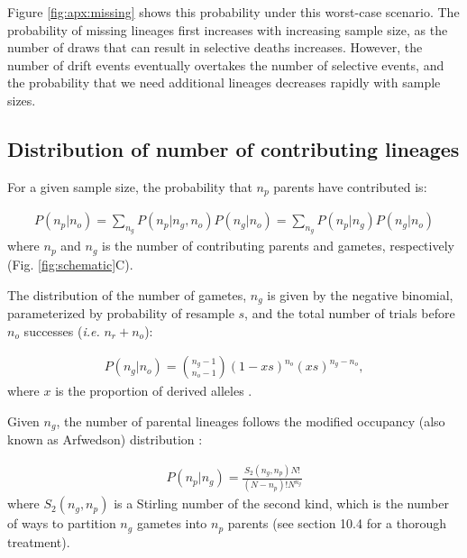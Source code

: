 \documentclass[review]{elsarticle}
\newcommand{\sgcomment}[1]{{\color{red}{SG: #1}}}
\begin{document}
Figure \ref{fig:apx:missing} shows this probability under this worst-case scenario. The probability
of missing lineages first increases with increasing sample size, as the number of draws that can
result in selective deaths increases. However, the number of drift events eventually overtakes the
number of selective events, and the probability that we need additional lineages decreases rapidly
with sample sizes.


\subsection{Distribution of number of contributing lineages}
\label{subsec:distribution}

For a given sample size, the probability that $n_p$ parents have contributed is:

\begin{align}
  \label{eq:conditional}
  P(n_p | n_o) = \sum_{n_g} P(n_p | n_g,n_o)P(n_g | n_o) = \sum_{n_g} P(n_p | n_g)P(n_g | n_o) 
\end{align}
where $n_p$ and $n_g$ is the number of contributing parents and gametes, respectively (Fig.
\ref{fig:schematic}C). 

The distribution of the number of gametes, $n_g$ is given by the negative binomial, parameterized by
probability of resample $s$, and the total number of trials before $n_o$ successes (\textit{i.e.}
$n_r+n_o$): \sgcomment{ The parameter is the number of successes -- the number of trials is the random variable:
The distribution of the number of gametes, $n_g\geq n_o$ is given by the negative binomial, parameterized by
probability of success $1-s$, and the total number of required successes $n_o$ successes:}



\begin{align}
  \label{eq:neg-binomial-trials}
  P(n_g|n_o) = \binom{n_g-1}{n_o-1}(1-xs)^{n_o}(xs)^{n_g-n_o},
\end{align}
where $x$ is the proportion of derived alleles \sgcomment{is this in the parental population or the sample? It would be true for both I think!}. 


Given $n_g$, the number of parental lineages follows the modified occupancy (also known as Arfwedson) distribution \citep{Wakeley2009,ONeill2019,JohnsonEtAl2005}:

\begin{align}
  \label{eq:occupancy}
  P(n_p|n_g) = \frac{S_2(n_g,n_p) N!}{(N-n_p)! N^{n_g}}
\end{align}
where $S_2(n_g,n_p)$ is a Stirling number of the second kind, which is the number of ways to
partition $n_g$ gametes into $n_p$ parents (see \cite{JohnsonEtAl2005} section 10.4 for a thorough
treatment). %
\end{document}
